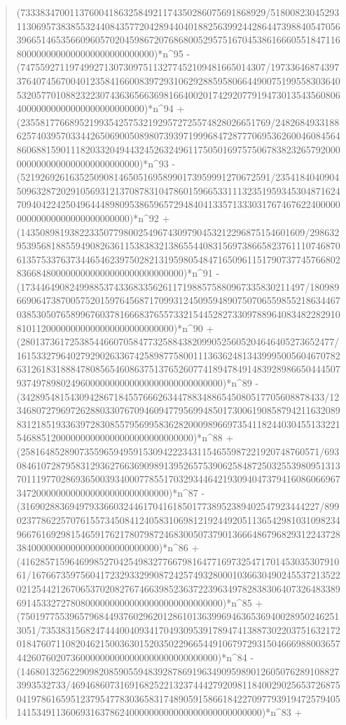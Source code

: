 \documentclass[11pt,a4paper]{article}
\theoremstyle{plain}
\theoremstyle{definition}
\begin{document}
\begin{quote}
(73338347001137600418632584921174350286075691868929/518008230452931130695738385532440843577204289440401882563992442864473988405470563966514653566096057020459867207686800529575167045386166605518471168000000000000000000000000000)*n\^{}95 - (74755927119749927130730975113277452109481665014307/1973364687439737640745670040123584166008397293106292885958066449007519955830364053205770108823223074363656636981664002017429207791947301354356080640000000000000000000000000)*n\^{}94 + (235581776689521993542575321929572725574828026651769/24826849331886257403957033442650690050898073939719996847287770695362600460845648606881590111820332049443245263249611750501697575067838232657920000000000000000000000000000)*n\^{}93 - (521926926163525090814650516958990173959991270672591/235418404090450963287202910569312137087831047860159665331113235195934530487162470940422425049644489809538659657294840413357133303176746762240000000000000000000000000000)*n\^{}92 + (1435089819382233507798002549674309790453212296875154601609/2986329539568188559490826361153838321386554408315697386658237611107468706135753376373446546239750282131959805484716509611517907377457668028366848000000000000000000000000000)*n\^{}91 - (1734464908249988537433683356261171988575880967335830211497/18098966906473870057520159764568717099312450959489075070655985521863446703853050765899676037816668376557332154452827330978896408348228291081011200000000000000000000000000)*n\^{}90 + (2801373617253854466070584773258843820990525605204646405273652477/161533279640279290263367425898775800111363624813439995005604670782631261831888478085654608637513765260774189478491483928986650444507937497898024960000000000000000000000000000)*n\^{}89 - (34289548154309428671845576662634478834886545080517705608878433/12346807279697262880330767094609477956994850173006190858794211632089831218519336397283085579569958362820009896697354118244030455133221546885120000000000000000000000000000)*n\^{}88 + (2581648528907355965949591530942223431154655987221920748760571/6930846107287958312936276636909891395265753906258487250325539809513137011197702869365003934000778551703293446421930940473794160860669673472000000000000000000000000000)*n\^{}87 - (3169028836949793366032446170416185017738952389402547923444227/89902377862257076155734508412405831069812192449205113654298103109823496676169298154659176217807987246830050737901366648679682931224372838400000000000000000000000000)*n\^{}86 + (4162857159646998527042549832776679816477169732547170145303530791061/167667359756041723293329908724257493280001036630490245537213522021254421267065370208276746639852363722396349782838306407326483389691453327278080000000000000000000000000000)*n\^{}85 + (750197755396579684493760296201286101363996946365369400289502462513051/735383156824744400409341704930953917894741388730220375163217201847607110820462150036301520350229665449106797293150466698800365744260760207360000000000000000000000000000)*n\^{}84 - (146801325622909820859055948392878691963490959890126050762891088273993532733/469468607316916825221323744427920981184002902565372687504197861659512379547783036583174890591586618422709779391947257940514153491136069316378624000000000000000000000000000)*n\^{}83 + 
\end{quote}
\end{document}
